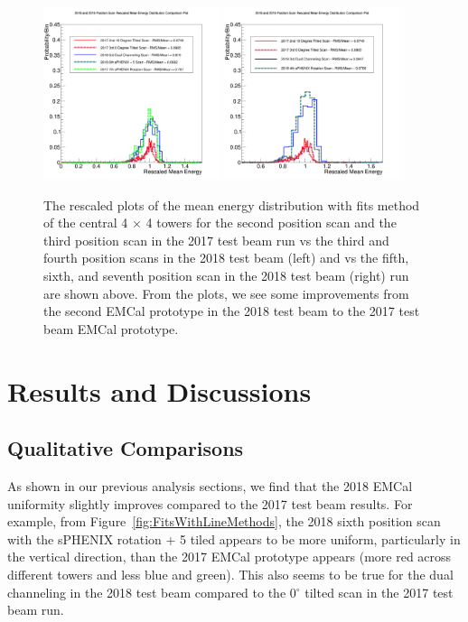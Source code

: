 \documentclass[hidelinks,11pt]{article}
\numberwithin{figure}{section}
\numberwithin{table}{section}
\newcommand{\degree}{\mbox{$^\circ$}\xspace}
\begin{document}
\begin{figure}[hbtp]
\begin{center}
\includegraphics[width=0.46\textwidth]{Plots/AllComparison/AllComparison0.png}
\includegraphics[width=0.46\textwidth]{Plots/AllComparison/AllComparison1.png}
\caption{The rescaled plots of the mean energy distribution with fits method of the central 4 $\times$ 4 towers for the second position scan and the third position scan in the 2017 test beam run vs the third and fourth position scans in the 2018 test beam (left) and vs the fifth, sixth, and seventh position scan in the 2018 test beam (right) run are shown above. From the plots, we see some improvements from the second EMCal prototype in the 2018 test beam to the 2017 test beam EMCal prototype.}
\label{fig:RMSRE}
\end{center}
\end{figure} 

\section{Results and Discussions}

\subsection{Qualitative Comparisons}
As shown in our previous analysis sections, we find that the 2018 EMCal uniformity slightly improves compared to the 2017 test beam results. For example, from Figure~\ref{fig:FitsWithLineMethods}, the 2018 sixth position scan with the sPHENIX rotation + 5 tiled appears to be more uniform, particularly in the vertical direction, than the 2017 EMCal prototype appears (more red across different towers and less blue and green). This also seems to be true for the dual channeling in the 2018 test beam compared to the 0\degree tilted scan in the 2017 test beam run. 
\end{document}
